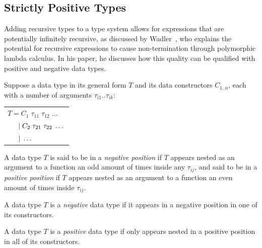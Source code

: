 
\subsection{Strictly Positive Types}

Adding recursive types to a type system allows for expressions that are potentially infinitely recursive,
as discussed by Wadler~\cite{RecursiveTypesForFree}, who explains the potential for recursive expressions
to cause non-termination through polymorphic lambda calculus. In his paper, he discusses how this
quality can be qualified with positive and negative data types.

Suppose a data type in its general form $T$ and its data constructors $C_{1..n}$, each with a number of arguments 
$\tau_{i1}..\tau_{ik}$:

\begin{center}
    \begin{tabular}{l}
        $T = C_1\; \tau_{11} \; \tau_{12} \; \dots$ \\
        $\hspace{1.5em} \vert\; C_2\; \tau_{21} \; \tau_{22} \; \dots$ \\
        $\hspace{1.5em} \vert\; \dots$ \\
    \end{tabular} 
\end{center}

\theoremstyle{definition}
\begin{definition}
    A data type $T$ is said to be in a \textit{negative position} if $T$ appears nested as an argument
    to a function an odd amount of times inside any $\tau_{ij}$, and said to be in a \textit{positive position}
    if $T$ appears nested as an argument to a function an even amount of times inside $\tau_{ij}$.
\end{definition}

\theoremstyle{definition}
\begin{definition}
    A data type $T$ is a \textit{negative} data type if it appears in a negative position 
    in one of its constructors.
\end{definition}

\theoremstyle{definition}
\begin{definition}
    A data type $T$ is a \textit{positive} data type if only appears nested in a positive position
    in all of its constructors.
\end{definition}

